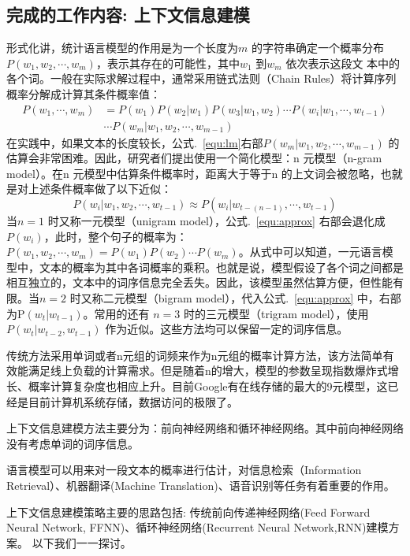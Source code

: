 \documentclass[twoside,UTF8,AutoFakeBold]{buaathesis}
\begin{document}
\subsection{完成的工作内容: 上下文信息建模}
形式化讲，统计语言模型的作用是为一个长度为$m$ 的字符串确定一个概率分布$P(w_1,w_2,\cdots,w_m)$，表示其存在的可能性，其中$w_1$ 到$w_m$ 依次表示这段文
本中的各个词。一般在实际求解过程中，通常采用链式法则（Chain Rules）将计算序列概率分解成计算其条件概率值：
\begin{equation}
\label{equ:lm}
\begin{split}
P(w_1,\cdots,w_m) &= P(w_1) P(w_2|w_1) P(w_3|w_1,w_2)\cdots P(w_i | w_1,\cdots,w_{t-1}) \\
&\cdots P(w_m | w_1,w_2,\cdots,w_{m-1})
\end{split}
\end{equation}
在实践中，如果文本的长度较长，公式.~\ref{equ:lm}右部$ P(w_m | w_1,w_2,\cdots,w_{m-1}) $ 的估算会非常困难。因此，研究者们提出使用一个简化模型：n 元模型（n-gram model）。在n 元模型中估算条件概率时，距离大于等于n 的上文词会被忽略，也就是对上述条件概率做了以下近似：
\begin{equation}
\label{equ:approx}
P(w_i | w_1,w_2,\cdots,w_{t-1})  \approx P(w_i | w_{t-(n-1)},\cdots,w_{t-1})
\end{equation}
当$n = 1$ 时又称一元模型（unigram model），公式.~\ref{equ:approx} 右部会退化成$P(w_i)$，此时，整个句子的概率为：$P(w_1,w_2,\cdots,w_m) = P(w_1)P(w_2) \cdots P(w_m)$。从式中可以知道，一元语言模型中，文本的概率为其中各词概率的乘积。也就是说，模型假设了各个词之间都是相互独立的，文本中的词序信息完全丢失。因此，该模型虽然估算方便，但性能有限。当$n = 2$ 时又称二元模型（bigram model），代入公式.~\ref{equ:approx} 中，右部为P$(w_t|w_{t-1})$。常用的还有 $n = 3$ 时的三元模型（trigram model），使用$P(w_t |w_{t-2},w_{t-1})$ 作为近似。这些方法均可以保留一定的词序信息。

传统方法采用单词或者n元组的词频来作为n元组的概率计算方法，该方法简单有效能满足线上负载的计算需求。但是随着n的增大，模型的参数呈现指数爆炸式增长、概率计算复杂度也相应上升。目前Google有在线存储的最大的9元模型，这已经是目前计算机系统存储，数据访问的极限了。


上下文信息建模方法主要分为：前向神经网络和循环神经网络。其中前向神经网络没有考虑单词的词序信息。


语言模型可以用来对一段文本的概率进行估计，对信息检索（Information Retrieval）、机器翻译(Machine Translation)、语音识别等任务有着重要的作用。


上下文信息建模策略主要的思路包括: 传统前向传递神经网络(Feed Forward Neural Network, FFNN)、循环神经网络(Recurrent Neural Network,RNN)建模方案。 以下我们一一探讨。
\end{document}

